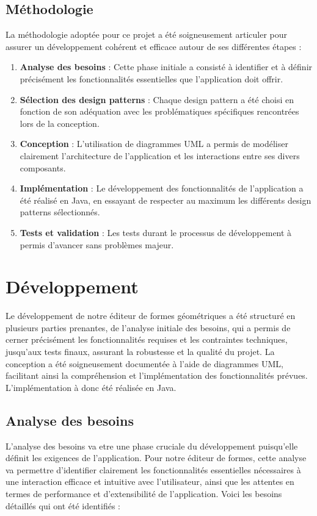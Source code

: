 \documentclass[a4paper,11pt]{article}
\begin{document}
\subsection{Méthodologie}
    La méthodologie adoptée pour ce projet a été soigneusement articuler pour assurer un développement cohérent et efficace autour de ses différentes étapes :

    \begin{enumerate}
        \item \textbf{Analyse des besoins} : Cette phase initiale a consisté à identifier et à définir précisément les fonctionnalités essentielles que l'application doit offrir. 

        \item \textbf{Sélection des design patterns} : Chaque design pattern a été choisi en fonction de son adéquation avec les problématiques spécifiques rencontrées lors de la conception. 

        \item \textbf{Conception} : L'utilisation de diagrammes UML a permis de modéliser clairement l'architecture de l'application et les interactions entre ses divers composants.

        \item \textbf{Implémentation} : Le développement des fonctionnalités de l'application a été réalisé en Java, en essayant de respecter au maximum les différents design patterns sélectionnés.

        \item \textbf{Tests et validation} : Les tests durant le processus de développement à permis d'avancer sans problèmes majeur.

    \end{enumerate}
\pagebreak
\section{Développement}
Le développement de notre éditeur de formes géométriques a été structuré en plusieurs parties prenantes, de l'analyse initiale des besoins, qui a permis de cerner précisément les fonctionnalités requises et les contraintes techniques, jusqu'aux tests finaux, assurant la robustesse et la qualité du projet. La conception a été soigneusement documentée à l'aide de diagrammes UML, facilitant ainsi la compréhension et l'implémentation des fonctionnalités prévues. L'implémentation à donc été réalisée en Java.

\subsection{Analyse des besoins}
L'analyse des besoins va etre une phase cruciale du développement puisqu'elle définit les exigences de l'application. Pour notre éditeur de formes, cette analyse va permettre d'identifier clairement les fonctionnalités essentielles nécessaires à une interaction efficace et intuitive avec l'utilisateur, ainsi que les attentes en termes de performance et d'extensibilité de l'application. Voici les besoins détaillés qui ont été identifiés :
\end{document}
